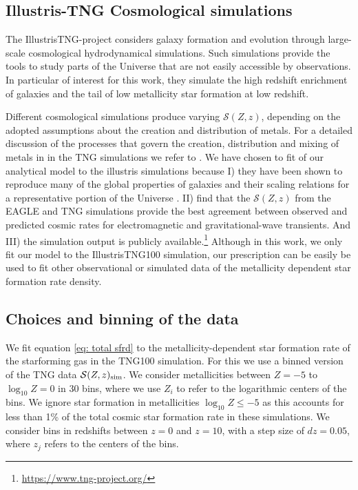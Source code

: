 \documentclass[twocolumn]{aastex631}
\newcommand{\SFRDzZ}{\ensuremath{\mathcal{S}(Z,z)}\xspace}
\begin{document}
\subsection{Illustris-TNG Cosmological simulations}
The IllustrisTNG-project \citep[or TNG in short][]{FirstResTNG_Springel2018,FirstResTNG_Marinacci2018, FirstResTNG_Nelson2018,FirstResTNG_Pillepich2018, FirstResTNG_Naiman2018} considers galaxy formation and evolution through large-scale cosmological hydrodynamical simulations.
Such simulations provide the tools to study parts of the Universe that are not easily accessible by observations. In particular of interest for this work, they simulate the high redshift enrichment of galaxies and the tail of low metallicity star formation at low redshift.

Different cosmological simulations produce varying \SFRDzZ, depending on the adopted assumptions about the creation and distribution of metals. For a detailed discussion of the processes that govern the creation, distribution and mixing of metals in in the TNG simulations we refer to \cite{Pakmor+2022}.
We have chosen to fit of our analytical model to the illustris simulations because I) they have been shown to reproduce many of the global properties of galaxies and their scaling relations for a representative portion of the Universe \citep[e.g.][]{FirstResTNG_Naiman2018,Torrey+2021,Genel+2018,Hemler+2021}. 
II) \cite{Briel+2021} find that the \SFRDzZ from the EAGLE \citep{Schaye+2015,Crain+2015} and TNG simulations provide the best agreement between observed and predicted cosmic rates for electromagnetic and gravitational-wave transients. And III) the simulation output is publicly available.\footnote{ \url{https://www.tng-project.org/}} 
Although in this work, we only fit our model to the IllustrisTNG100 simulation, our prescription can be easily be used to fit other observational or simulated data of the metallicity dependent star formation rate density.


\subsection{Choices and binning of the data}
We fit equation \ref{eq: total sfrd} to the metallicity-dependent star formation rate of the starforming gas in the TNG100 simulation. For this we use a binned version of the TNG data $\SFRDzZ_{\rm sim}$. We consider metallicities between $Z= -5$ to $\log_{10} Z= 0$ in 30 bins, where we use $Z_i$ to refer to the logarithmic centers of the bins. We ignore star formation in metallicities $\log_{10} Z \le -5$ as this accounts for less than 1\% of the total cosmic star formation rate in these simulations.
We consider bins in redshifts between $z=0$ and $z=10$, with a step size of $dz=0.05$, where $z_j$ refers to the centers of the bins. 
\end{document}
